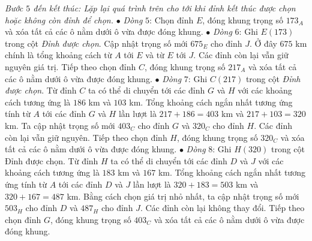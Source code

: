 \begin{multicols}{2}
\begin{table}[H]
		\centering
		\captionsetup{labelformat= empty, justification=centering}
		\vspace*{-10pt}
	\end{table}
	\textit{Bước $5$ đến kết thúc: Lặp lại quá trình trên cho tới khi đỉnh kết thúc được chọn hoặc không còn đỉnh để chọn.}
	\vskip 0.1cm 
	$\bullet$ \textit{Dòng} $5$: Chọn đỉnh $E$, đóng khung trọng số $173_A$ và xóa tất cả các ô nằm dưới ô vừa được đóng khung. 
	\vskip 0.1cm
	$\bullet$ \textit{Dòng} $6$: Ghi $E(173)$ trong cột \textit{Đỉnh được chọn}. Cập nhật trọng số mới $675_E$ cho đỉnh $J$. Ở đây $675$ km chính là tổng khoảng cách từ $A$ tới $E$ và từ $E$ tới $J$. Các đỉnh còn lại vẫn giữ nguyên giá trị. Tiếp theo chọn đỉnh $C$, đóng khung trọng số $217_A$ và xóa tất cả các ô nằm dưới ô vừa được đóng khung.
	\vskip 0.1cm 
	$\bullet$ \textit{Dòng} $7$: Ghi $C(217)$ trong cột \textit{Đỉnh được chọn}. Từ đỉnh $C$ ta có thể di chuyển tới các đỉnh $G$ và $H$ với các khoảng cách tương ứng là $186$ km và $103$ km. Tổng khoảng cách ngắn nhất tương ứng tính từ $A$ tới các đỉnh $G$ và $H$ lần lượt là $217+186=403$ km và $217+103=320$ km. Ta cập nhật trọng số mới $403_C$ cho đỉnh $G$ và $320_C$ cho đỉnh $H$. Các đỉnh còn lại vẫn giữ nguyên. Tiếp theo chọn đỉnh $H$, đóng khung trọng số $320_C$ và xóa tất cả các ô nằm dưới ô vừa được đóng khung.
	\vskip 0.1cm
	$\bullet$ \textit{Dòng} $8$: Ghi $H(320)$ trong cột Đỉnh được chọn. Từ đỉnh $H$ ta có thể di chuyển tới các đỉnh $D$ và $J$ với các khoảng cách tương ứng là $183$ km và $167$ km. Tổng khoảng cách ngắn nhất tương ứng tính từ $A$ tới các đỉnh $D$ và $J$ lần lượt là $320+183=503$ km và $320+167=487$ km. Bằng cách chọn giá trị nhỏ nhất, ta cập nhật trọng số mới $503_H$ cho đỉnh $D$ và $487_H$ cho đỉnh $J$. Các đỉnh còn lại không thay đổi. Tiếp theo chọn đỉnh $G$, đóng khung trọng số $403_C$ và xóa tất cả các ô nằm dưới ô vừa được đóng khung.

\end{multicols}
